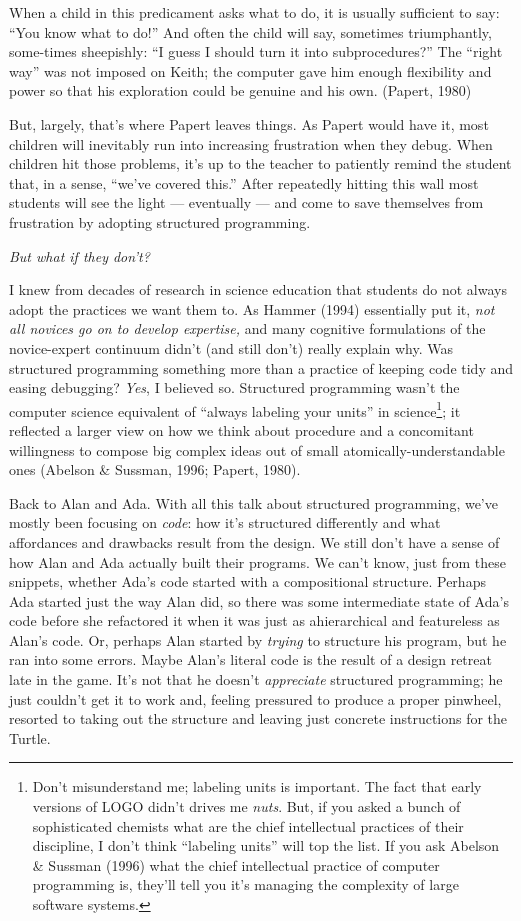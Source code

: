 When a child in this predicament asks what to do, it is usually
sufficient to say: ``You know what to do!'' And often the child will
say, sometimes triumphantly, some-times sheepishly: ``I guess I should
turn it into subprocedures?'' The ``right way'' was not imposed on
Keith; the computer gave him enough flexibility and power so that his
exploration could be genuine and his own. (Papert, 1980)

But, largely, that's where Papert leaves things. As Papert would have
it, most children will inevitably run into increasing frustration when
they debug. When children hit those problems, it's up to the teacher to
patiently remind the student that, in a sense, ``we've covered this.''
After repeatedly hitting this wall most students will see the light ---
eventually --- and come to save themselves from frustration by adopting
structured programming.

\emph{But what if they don't?}

I knew from decades of research in science education that students do
not always adopt the practices we want them to. As Hammer (1994)
essentially put it, \emph{not all novices go on to develop expertise,}
and many cognitive formulations of the novice-expert continuum didn't
(and still don't) really explain why. Was structured programming
something more than a practice of keeping code tidy and easing
debugging? \emph{Yes}, I believed so. Structured programming wasn't the
computer science equivalent of ``always labeling your units'' in
science\footnote{Don't misunderstand me; labeling units is important.
  The fact that early versions of LOGO didn't drives me \emph{nuts}.
  But, if you asked a bunch of sophisticated chemists what are the chief
  intellectual practices of their discipline, I don't think ``labeling
  units'' will top the list. If you ask Abelson \& Sussman (1996) what
  the chief intellectual practice of computer programming is, they'll
  tell you it's managing the complexity of large software systems.}; it
reflected a larger view on how we think about procedure and a
concomitant willingness to compose big complex ideas out of small
atomically-understandable ones (Abelson \& Sussman, 1996; Papert, 1980).

Back to Alan and Ada. With all this talk about structured programming,
we've mostly been focusing on \emph{code}: how it's structured
differently and what affordances and drawbacks result from the design.
We still don't have a sense of how Alan and Ada actually built their
programs. We can't know, just from these snippets, whether Ada's code
started with a compositional structure. Perhaps Ada started just the way
Alan did, so there was some intermediate state of Ada's code before she
refactored it when it was just as ahierarchical and featureless as
Alan's code. Or, perhaps Alan started by \emph{trying} to structure his
program, but he ran into some errors. Maybe Alan's literal code is the
result of a design retreat late in the game. It's not that he doesn't
\emph{appreciate} structured programming; he just couldn't get it to
work and, feeling pressured to produce a proper pinwheel, resorted to
taking out the structure and leaving just concrete instructions for the
Turtle.


